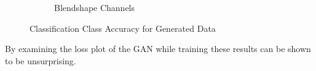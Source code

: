 \begin{figure}[h!]
\begin{subfigure}[b]{0.49\textwidth}
        \caption{Blendshape Channels}\label{fig:gan_blendshape_channels}
    \end{subfigure}
    \caption{Classification Class Accuracy for Generated Data}\label{fig:gan_class_acc}
\end{figure}

By examining the loss plot of the GAN while training these results can be shown to be unsurprising.

